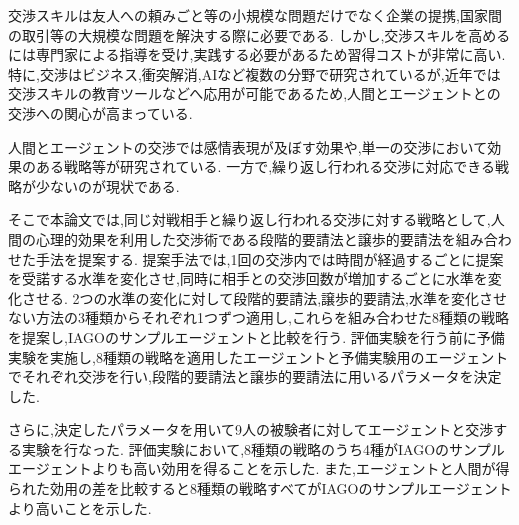 
交渉スキルは友人への頼みごと等の小規模な問題だけでなく企業の提携,国家間の取引等の大規模な問題を解決する際に必要である.
しかし,交渉スキルを高めるには専門家による指導を受け,実践する必要があるため習得コストが非常に高い.
特に,交渉はビジネス,衝突解消,AIなど複数の分野で研究されているが,近年では交渉スキルの教育ツールなどへ応用が可能であるため,人間とエージェントとの交渉への関心が高まっている.

人間とエージェントの交渉では感情表現が及ぼす効果や,単一の交渉において効果のある戦略等が研究されている.
一方で,繰り返し行われる交渉に対応できる戦略が少ないのが現状である.

そこで本論文では,同じ対戦相手と繰り返し行われる交渉に対する戦略として,人間の心理的効果を利用した交渉術である段階的要請法と譲歩的要請法を組み合わせた手法を提案する.
提案手法では,1回の交渉内では時間が経過するごとに提案を受諾する水準を変化させ,同時に相手との交渉回数が増加するごとに水準を変化させる.
2つの水準の変化に対して段階的要請法,譲歩的要請法,水準を変化させない方法の3種類からそれぞれ1つずつ適用し,これらを組み合わせた8種類の戦略を提案し,IAGOのサンプルエージェントと比較を行う.
評価実験を行う前に予備実験を実施し,8種類の戦略を適用したエージェントと予備実験用のエージェントでそれぞれ交渉を行い,段階的要請法と譲歩的要請法に用いるパラメータを決定した.

さらに,決定したパラメータを用いて9人の被験者に対してエージェントと交渉する実験を行なった.
評価実験において,8種類の戦略のうち4種がIAGOのサンプルエージェントよりも高い効用を得ることを示した.
また,エージェントと人間が得られた効用の差を比較すると8種類の戦略すべてがIAGOのサンプルエージェントより高いことを示した.
